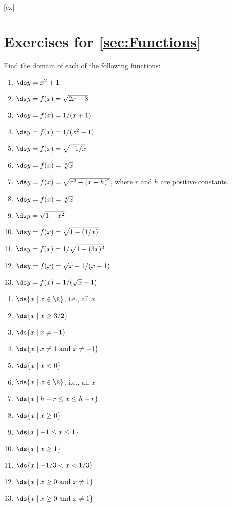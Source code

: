 [ex]
\section*{Exercises for \ref{sec:Functions}}

\begin{enumialphparenastyle}

\begin{ex}
Find the domain of each of the following functions:
\begin{multicols}{2}
\begin{enumerate}
	\item	$\ds y=x^2+1$
	\item	$\ds y=f(x)=\sqrt{2x-3}$
	\item	$\ds y=f(x)=1/(x+1)$
	\item	$\ds y=f(x)=1/(x^2-1)$
	\item	$\ds y=f(x)=\sqrt{-1/x}$
	\item	$\ds y=f(x)={\root 3 \of x}$
	\item	$\ds y=f(x)=\sqrt{r^2-(x-h)^2}$, where $r$ and $h$ are positive constants.
	\item	$\ds y=f(x)={\root 4 \of x}$
	\item	$\ds y=\sqrt{1-x^2}$
	\item	$\ds y=f(x)=\sqrt{1-(1/x)}$
	\item	$\ds y=f(x)=1/\sqrt{1-(3x)^2}$
	\item	$\ds y=f(x)=\sqrt{x}+1/(x-1)$
	\item	$\ds y=f(x)=1/(\sqrt{x}-1)$
\end{enumerate}
\end{multicols}
\begin{sol}
\begin{enumerate}
	\item	$\ds \{x\mid x\in \R\}$, i.e., all $x$
	\item	$\ds \{x\mid x\ge 3/2\}$
	\item	$\ds \{x\mid x\not=-1\}$
	\item	$\ds \{x\mid x\not=1 \hbox{ and } x\not=-1\}$
	\item	$\ds \{x\mid x<0\}$
	\item	$\ds \{x\mid x\in \R\}$, i.e., all $x$
	\item	$\ds \{x\mid h-r\le x\le h+r\}$
	\item	$\ds \{x\mid x\ge0\}$
	\item	$\ds \{x\mid -1\le x\le 1\}$
	\item	$\ds \{x\mid x\ge 1\}$
	\item	$\ds \{x\mid -1/3< x< 1/3\}$
	\item	$\ds \{x\mid x\ge0  \hbox{ and } x\not=1\}$
	\item	$\ds \{x\mid x\ge0  \hbox{ and } x\not=1\}$
\end{enumerate}
\end{sol}
\end{ex}


\end{enumialphparenastyle}

